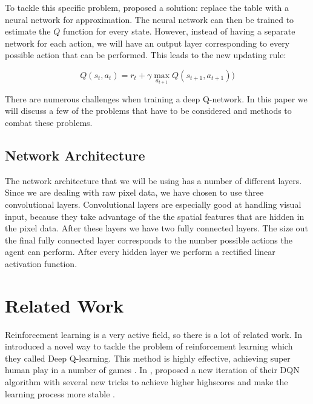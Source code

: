 \documentclass{article}
\begin{document}
To tackle this specific problem, \citeauthor{mnih2013playing} proposed a solution: replace the table with a neural network for approximation. The neural network can then be trained to estimate the $Q$ function for every state. However, instead of having a separate network for each action, we will have an output layer corresponding to every possible action that can be performed. This leads to the new updating rule:

\[
    Q(s_t,a_t) = r_t + \gamma \max_{a_{t+1}} Q(s_{t+1},a_{t+1}))
\]


There are numerous challenges when training a deep Q-network. In this paper we will discuss a few of the problems that have to be considered and methods to combat these problems.

\subsection{Network Architecture}

The network architecture that we will be using has a number of different layers. Since we are dealing with raw pixel data, we have chosen to use three convolutional layers. Convolutional layers are especially good at handling visual input, because they take advantage of the the spatial features that are hidden in the pixel data. After these layers we have two fully connected layers. The size out the final fully connected layer corresponds to the number possible actions the agent can perform. After every hidden layer we perform a rectified linear activation function.



\section{Related Work}

Reinforcement learning is a very active field, so there is a lot of related work. In \citeyear{mnih2013playing} \citeauthor{mnih2013playing} introduced a novel way to tackle the problem of reinforcement learning which they called Deep Q-learning. This method is highly effective, achieving super human play in a number of games \cite{mnih2013playing}. In \citeyear{mnih2015human}, \citeauthor{mnih2013playing} proposed a new iteration of their DQN algorithm with several new tricks to achieve higher highscores and make the learning process more stable \cite{mnih2015human}.
\end{document}
